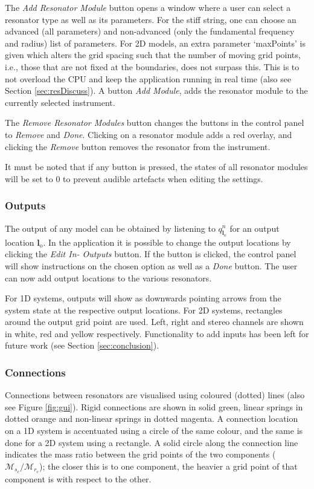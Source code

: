 \documentclass{article}
\begin{document}
The \textit{Add Resonator Module} button opens a window where a user can select a resonator type as well as its parameters. For the stiff string, one can choose an advanced (all parameters) and non-advanced (only the fundamental frequency and radius) list of parameters. For 2D models, an extra parameter `maxPoints' is given which alters the grid spacing such that the number of moving grid points, i.e., those that are not fixed at the boundaries, does not surpass this. This is to not overload the CPU and keep the application running in real time (also see Section \ref{sec:resDiscuss}). A button \textit{Add Module}, adds the resonator module to the currently selected instrument.

The \textit{Remove Resonator Modules} button changes the buttons in the control panel to \textit{Remove} and \textit{Done}. Clicking on a resonator module adds a red overlay, and clicking the \textit{Remove} button removes the resonator from the instrument.

It must be noted that if any button is pressed, the states of all resonator modules will be set to 0 to prevent audible artefacts when editing the settings. 


\subsubsection{Outputs}
The output of any model can be obtained by listening to $q_{\boldsymbol{l}_\text{o}}^n$ for an output location $\boldsymbol{l}_\text{o}$. In the application it is possible to change the output locations by clicking the \textit{Edit In- Outputs} button. If the button is clicked, the control panel will show instructions on the chosen option as well as a \textit{Done} button. The user can now add output locations to the various resonators. 

For 1D systems, outputs will show as downwards pointing arrows from the system state at the respective output locations. For 2D systems, rectangles around the output grid point are used. Left, right and stereo channels are shown in white, red and yellow respectively. Functionality to add inputs has been left for future work (see Section \ref{sec:conclusion}).

\subsubsection{Connections}\label{sec:connectionsApp}
Connections between resonators are visualised using coloured (dotted) lines (also see Figure \ref{fig:gui}). Rigid connections are shown in solid green, linear springs in dotted orange and non-linear springs in dotted magenta. A connection location on a 1D system is accentuated using a circle of the same colour, and the same is done for a 2D system using a rectangle. A solid circle along the connection line indicates the mass ratio between the grid points of the two components ($\mathcal{M}_{s_c} / \mathcal{M}_{r_c}$); the closer this is to one component, the heavier a grid point of that component is with respect to the other.  
\end{document}

